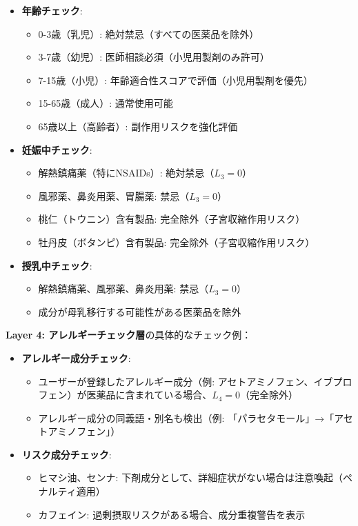 \documentclass[a4paper,11pt,ja=standard,xelatex]{bxjsarticle}
\theoremstyle{definition}
\begin{document}
\begin{itemize}
\item \textbf{年齢チェック}:
  \begin{itemize}
  \item 0-3歳（乳児）: 絶対禁忌（すべての医薬品を除外）
  \item 3-7歳（幼児）: 医師相談必須（小児用製剤のみ許可）
  \item 7-15歳（小児）: 年齢適合性スコアで評価（小児用製剤を優先）
  \item 15-65歳（成人）: 通常使用可能
  \item 65歳以上（高齢者）: 副作用リスクを強化評価
  \end{itemize}

\item \textbf{妊娠中チェック}:
  \begin{itemize}
  \item 解熱鎮痛薬（特にNSAIDs）: 絶対禁忌（$L_3 = 0$）
  \item 風邪薬、鼻炎用薬、胃腸薬: 禁忌（$L_3 = 0$）
  \item 桃仁（トウニン）含有製品: 完全除外（子宮収縮作用リスク）
  \item 牡丹皮（ボタンピ）含有製品: 完全除外（子宮収縮作用リスク）
  \end{itemize}

\item \textbf{授乳中チェック}:
  \begin{itemize}
  \item 解熱鎮痛薬、風邪薬、鼻炎用薬: 禁忌（$L_3 = 0$）
  \item 成分が母乳移行する可能性がある医薬品を除外
  \end{itemize}
\end{itemize}

\textbf{Layer 4: アレルギーチェック層}の具体的なチェック例：

\begin{itemize}
\item \textbf{アレルギー成分チェック}:
  \begin{itemize}
  \item ユーザーが登録したアレルギー成分（例: アセトアミノフェン、イブプロフェン）が医薬品に含まれている場合、$L_4 = 0$（完全除外）
  \item アレルギー成分の同義語・別名も検出（例: 「パラセタモール」→「アセトアミノフェン」）
  \end{itemize}

\item \textbf{リスク成分チェック}:
  \begin{itemize}
  \item ヒマシ油、センナ: 下剤成分として、詳細症状がない場合は注意喚起（ペナルティ適用）
  \item カフェイン: 過剰摂取リスクがある場合、成分重複警告を表示
  \end{itemize}
\end{itemize}
\end{document}
